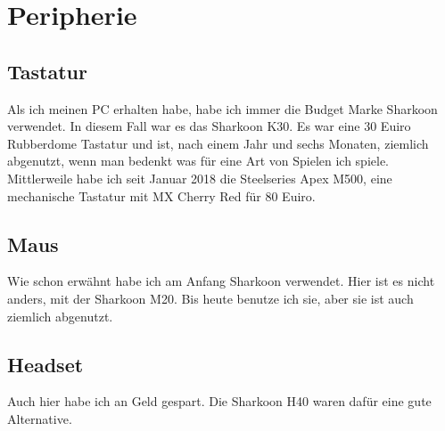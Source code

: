 \section{Peripherie}
\subsection{Tastatur}
Als ich meinen PC erhalten habe, habe ich immer die Budget Marke Sharkoon verwendet.
In diesem Fall war es das Sharkoon K30.
Es war eine 30 Euiro Rubberdome Tastatur und ist, nach einem Jahr und sechs Monaten, ziemlich abgenutzt, wenn man bedenkt was für eine Art von Spielen ich spiele.
Mittlerweile habe ich seit Januar 2018 die Steelseries Apex M500, eine mechanische Tastatur mit MX Cherry Red für 80 Euiro.
\subsection{Maus}
Wie schon erwähnt habe ich am Anfang Sharkoon verwendet. Hier ist es nicht anders, mit der Sharkoon M20. Bis heute benutze ich sie, aber sie ist auch ziemlich abgenutzt.
\subsection{Headset}
Auch hier habe ich an Geld gespart. Die Sharkoon H40 waren dafür eine gute Alternative.
